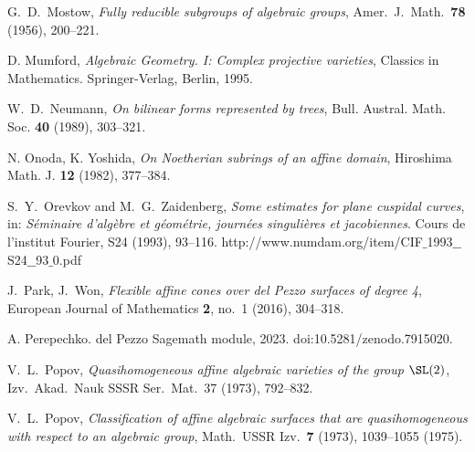 G.~D.~Mostow, \emph{Fully reducible subgroups of algebraic groups}, Amer.\ J.\ Math.\ \textbf{78} (1956), 200--221.

D. Mumford,
\emph{Algebraic Geometry. I: Complex projective varieties},
Classics in Mathematics. Springer-Verlag, Berlin,  1995.


W.~D.~Neumann, \emph{On bilinear forms represented by trees},
Bull. Austral. Math. Soc. \textbf{40} (1989), 303--321.

N. Onoda, K. Yoshida, \emph{On Noetherian subrings of an affine domain}, Hiroshima Math. J. \textbf{12} (1982), 377--384.

S.~Y.~Orevkov and  M.~G.~Zaidenberg,
\emph{Some estimates for plane cuspidal curves}, in:
\emph{S\'eminaire d'alg\`ebre et g\'eom\'etrie, journ\'ees singuli\`eres et jacobiennes}.
Cours de l'institut Fourier, S24 (1993), 93--116.
http://www.numdam.org/item/CIF$\_$1993$\_\!\!\_$S24$\_\!\!\_$93$\_$0.pdf

J.~Park, J.~Won, \emph{Flexible affine cones over del Pezzo surfaces of degree 4}, European Journal of Mathematics \textbf{2}, no.~1 (2016), 304--318.



A. Perepechko.
\newblock del {P}ezzo {S}agemath module, 2023.
\newblock doi:10.5281/zenodo.7915020.





V.~L.~Popov, \emph{Quasihomogeneous affine algebraic varieties of the group $\SL(2)$},
Izv.\ Akad.\ Nauk SSSR Ser.\ Mat.\, 37 (1973), 792--832.

V.~L.~Popov, \emph{Classification of affine algebraic surfaces that are
quasihomogeneous with respect
to an algebraic group}, Math.\ USSR Izv.\ \textbf{7} (1973), 1039--1055 (1975).

